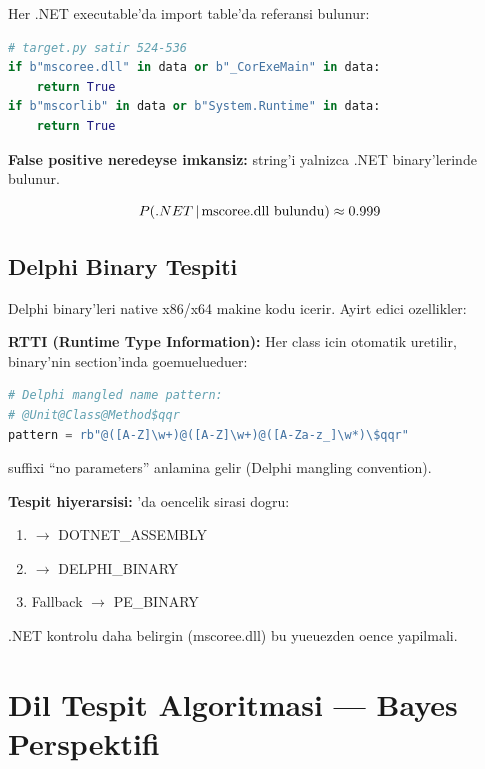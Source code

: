 Her .NET executable'da import table'da  referansi bulunur:

\begin{lstlisting}[language=Python]
# target.py satir 524-536
if b"mscoree.dll" in data or b"_CorExeMain" in data:
    return True
if b"mscorlib" in data or b"System.Runtime" in data:
    return True
\end{lstlisting}

\textbf{False positive neredeyse imkansiz:}  string'i yalnizca .NET binary'lerinde bulunur.

\begin{equation}
P\!\left(.NET \,|\, \text{mscoree.dll bulundu}\right) \approx 0.999
\end{equation}

\subsection{Delphi Binary Tespiti}

Delphi binary'leri native x86/x64 makine kodu icerir. Ayirt edici ozellikler:

\textbf{RTTI (Runtime Type Information):} Her class icin otomatik uretilir, binary'nin  section'inda goemuelueduer:

\begin{lstlisting}[language=Python]
# Delphi mangled name pattern:
# @Unit@Class@Method$qqr
pattern = rb"@([A-Z]\w+)@([A-Z]\w+)@([A-Za-z_]\w*)\$qqr"
\end{lstlisting}

 suffixi ``no parameters'' anlamina gelir (Delphi mangling convention).

\textbf{Tespit hiyerarsisi:} 'da oencelik sirasi dogru:
\begin{enumerate}
\item {} $\to$ DOTNET\_ASSEMBLY
\item {} $\to$ DELPHI\_BINARY
\item Fallback $\to$ PE\_BINARY
\end{enumerate}

.NET kontrolu daha belirgin (mscoree.dll) bu yueuezden oence yapilmali.


\section{Dil Tespit Algoritmasi --- Bayes Perspektifi}
\label{sec:lang-bayes}

